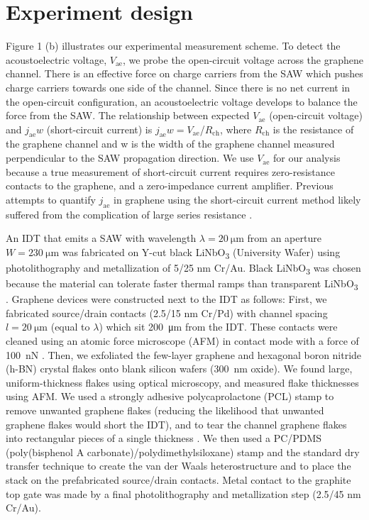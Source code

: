 \documentclass[double,12pt,1in,seploa]{beavtex}
\let\Oldsection\section
\renewcommand{\section}{\FloatBarrier\Oldsection}
\begin{document}
\section{Experiment design}
Figure 1 (b) illustrates our experimental measurement scheme. To detect the acoustoelectric voltage, $V_{\mathrm{ae}}$, we probe the open-circuit voltage across the graphene channel. There is an effective force on charge carriers from the SAW which pushes charge carriers towards one side of the channel.  Since there is no net current in the open-circuit configuration, an acoustoelectric voltage develops to balance the force from the SAW. The relationship between expected $V_{\mathrm{ae}}$ (open-circuit voltage) and $j_{\mathrm{ae}}w$ (short-circuit current) is $j_{\mathrm{ae}}w = V_{\mathrm{ae}}$/$R_{\mathrm{ch}}$, where $R_{\mathrm{ch}}$ is the resistance of the graphene channel and w is the width of the graphene channel measured perpendicular to the SAW propagation direction. We use $V_{\mathrm{ae}}$ for our analysis because a true measurement of short-circuit current requires zero-resistance contacts to the graphene, and a zero-impedance current amplifier. Previous attempts to quantify $j_{\mathrm{ae}}$ in graphene using the short-circuit current method likely suffered from the complication of large series resistance \cite{bandhu_macroscopic_2013,bandhu_controlling_2016,okuda_acoustic_2016,tang_ultra-low_2017,okuda_graphene_2018}. 

An IDT that emits a SAW with wavelength $\lambda =  \SI{20}{\micro\meter}$ from an aperture $W = \SI{230}{\micro\meter}$ was fabricated on Y-cut black LiNbO\textsubscript{3} (University Wafer) using photolithography and metallization of 5/25 nm Cr/Au. Black LiNbO\textsubscript{3} was chosen because the material can tolerate faster thermal ramps than transparent LiNbO\textsubscript{3}  \cite{fang_quantum_2023,lane_flip-chip_2018}. Graphene devices were constructed next to the IDT as follows: First, we fabricated source/drain contacts (2.5/15 nm Cr/Pd) with channel spacing $l = \SI{20}{\micro\meter}$ (equal to $\lambda$) which sit \SI{200}{\micro\meter} from the IDT. These contacts were cleaned using an atomic force microscope (AFM) in contact mode with a force of \SI{100}{\nano\newton} \cite{goossens_mechanical_2012}. Then, we exfoliated the few-layer graphene and hexagonal boron nitride (h-BN) crystal flakes onto blank silicon wafers (\SI{300}{\nano\meter} oxide). We found large, uniform-thickness flakes using optical microscopy, and measured flake thicknesses using AFM. We used a strongly adhesive polycaprolactone (PCL) stamp to remove unwanted graphene flakes (reducing the likelihood that unwanted graphene flakes would short the IDT), and to tear the channel graphene flakes into rectangular pieces of a single thickness \cite{son_strongly_2020}. We then used a PC/PDMS (poly(bisphenol A carbonate)/polydimethylsiloxane) stamp and the standard dry transfer technique \cite{wang_one-dimensional_2013} to create the van der Waals heterostructure and to place the stack on the prefabricated source/drain contacts. Metal contact to the graphite top gate was made by a final photolithography and metallization step (2.5/45 nm Cr/Au).
\end{document}
